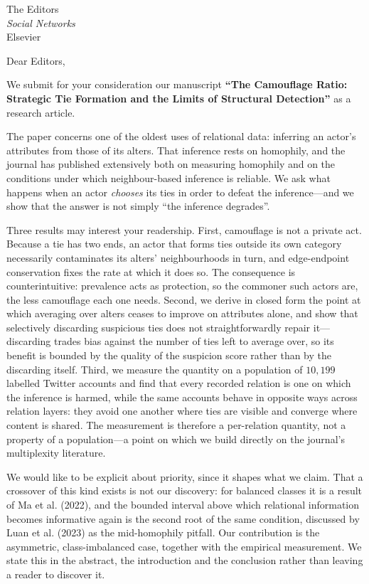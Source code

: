 \documentclass[11pt]{letter}
\begin{document}
\begin{letter}{The Editors \\ \textit{Social Networks} \\ Elsevier}

\opening{Dear Editors,}

We submit for your consideration our manuscript \textbf{``The Camouflage Ratio:
Strategic Tie Formation and the Limits of Structural Detection''} as a research
article.

The paper concerns one of the oldest uses of relational data: inferring an actor's
attributes from those of its alters. That inference rests on homophily, and the
journal has published extensively both on measuring homophily and on the conditions
under which neighbour-based inference is reliable. We ask what happens when an actor
\emph{chooses} its ties in order to defeat the inference---and we show that the
answer is not simply ``the inference degrades''.

Three results may interest your readership. First, camouflage is not a private act.
Because a tie has two ends, an actor that forms ties outside its own category
necessarily contaminates its alters' neighbourhoods in turn, and edge-endpoint
conservation fixes the rate at which it does so. The consequence is counterintuitive:
prevalence acts as protection, so the commoner such actors are, the less camouflage
each one needs. Second, we derive in closed form the point at which averaging over
alters ceases to improve on attributes alone, and show that selectively discarding
suspicious ties does not straightforwardly repair it---discarding trades bias against
the number of ties left to average over, so its benefit is bounded by the quality of
the suspicion score rather than by the discarding itself. Third, we measure the
quantity on a population of $10{,}199$ labelled Twitter accounts and find that
every recorded relation is one on which the inference is harmed, while the same
accounts behave in opposite ways across relation layers: they avoid one another where
ties are visible and converge where content is shared. The measurement is therefore a
per-relation quantity, not a property of a population---a point on which we build
directly on the journal's multiplexity literature.

We would like to be explicit about priority, since it shapes what we claim. That a
crossover of this kind exists is not our discovery: for balanced classes it is a
result of Ma et al. (2022), and the bounded interval above which relational
information becomes informative again is the second root of the same condition,
discussed by Luan et al. (2023) as the mid-homophily pitfall. Our contribution is the
asymmetric, class-imbalanced case, together with the empirical measurement. We state
this in the abstract, the introduction and the conclusion rather than leaving a
reader to discover it.


\end{letter}
\end{document}
